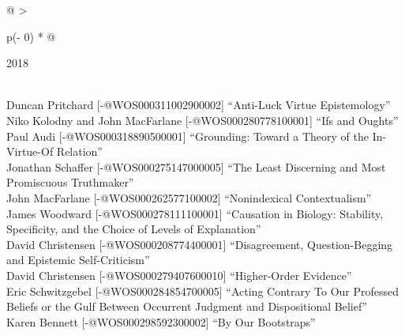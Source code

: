 \documentclass[
  10pt,
  letterpaper,
  DIV=11,
  numbers=noendperiod,
  twoside]{scrartcl}
\begin{document}
\begin{longtable}[]{@{}
  >{\raggedright\arraybackslash}p{(\columnwidth - 0\tabcolsep) * }@{}}

\caption{\label{tbl-top-ten-2009}Most cited articles published less than
ten years ago as of 2018.}

\tabularnewline

\toprule\noalign{}
\begin{minipage}[b]{\linewidth}\raggedright
2018
\end{minipage} \\
\midrule\noalign{}
\endhead
\bottomrule\noalign{}
\endlastfoot
Duncan Pritchard {[}-@WOS000311002900002{]} ``Anti-Luck Virtue
Epistemology'' \\
Niko Kolodny and John MacFarlane {[}-@WOS000280778100001{]} ``Ifs and
Oughts'' \\
Paul Audi {[}-@WOS000318890500001{]} ``Grounding: Toward a Theory of the
In-Virtue-Of Relation'' \\
Jonathan Schaffer {[}-@WOS000275147000005{]} ``The Least Discerning and
Most Promiscuous Truthmaker'' \\
John MacFarlane {[}-@WOS000262577100002{]} ``Nonindexical
Contextualism'' \\
James Woodward {[}-@WOS000278111100001{]} ``Causation in Biology:
Stability, Specificity, and the Choice of Levels of Explanation'' \\
David Christensen {[}-@WOS000208774400001{]} ``Disagreement,
Question-Begging and Epistemic Self-Criticism'' \\
David Christensen {[}-@WOS000279407600010{]} ``Higher-Order
Evidence'' \\
Eric Schwitzgebel {[}-@WOS000284854700005{]} ``Acting Contrary To Our
Professed Beliefs or the Gulf Between Occurrent Judgment and
Dispositional Belief'' \\
Karen Bennett {[}-@WOS000298592300002{]} ``By Our Bootstraps'' \\

\end{longtable}
\end{document}

